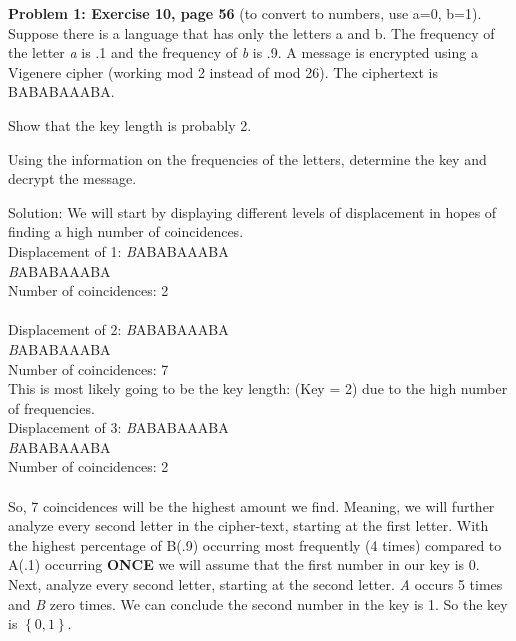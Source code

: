 \documentclass[12pt,letterpaper,final]{report}
\begin{document}

\vline


\noindent\textbf{Problem 1: Exercise 10, page 56}
 (to convert to numbers, use a=0, b=1). Suppose there is a language that has only the letters a and b. The frequency of the letter \textit a is .1 and the frequency of \textit b is .9. A message
is encrypted using a Vigenere cipher (working mod 2 instead of mod
26). The ciphertext is BABABAAABA.

\bigskip
{}
\begin{alphalist}
	\item Show that the key length is probably 2.
	\item Using the information on the frequencies of the letters, determine the key and decrypt the message.
\end{alphalist}



\bigskip  Solution: We will start by displaying different levels of displacement in hopes of finding a high number of coincidences. \\
Displacement of 1:  \indent\indent \textit BABABAAABA \\
\phantom{BBBBBBBBBB}  \indent\indent \textit BABABAAABA \\
Number of coincidences: 2 \\\\
Displacement of 2:  \indent\indent \textit BABABAAABA \\
\phantom{BBBBBBBBB}  \indent\indent \textit BABABAAABA \\
Number of coincidences: 7 \\ This is most likely going to be the key length: (Key = 2) due to the high number of frequencies.\\
Displacement of 3: \indent\indent \textit BABABAAABA \\
\phantom{BBBBBBBB} \indent\indent \textit BABABAAABA \\
Number of coincidences: 2 \\\\
So, 7 coincidences will be the highest amount we find. Meaning, we will further analyze every second letter in the cipher-text, starting at the first letter. With the highest percentage of B(.9) occurring most frequently (4 times) compared to A(.1) occurring \textbf{ONCE} we will assume that the first number in our key is 0. Next, analyze every second letter, starting at the second letter. \textit A occurs 5 times and \textit B zero times. We can conclude the second number in the key is 1. So the key is $\left\{0,1 \right\}$.
\end{document}
